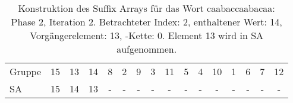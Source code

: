 \begin{table}[H]
\begin{adjustbox}{max width=\textwidth}
\begin{tabular}{lccccccccccccccc}
\multicolumn{1}{l|}{Gruppe}  & \multicolumn{1}{c|}{15} & 13                         & \multicolumn{1}{c|}{14}                         & \multicolumn{1}{c|}{8}     & \multicolumn{1}{c|}{2}      & \multicolumn{1}{c|}{9}    & \multicolumn{1}{c|}{3}     & \multicolumn{1}{c|}{11} & \multicolumn{1}{c|}{5}   & 4  & \multicolumn{1}{c|}{10} & 1   & 6   & 7   & 12  \\
\multicolumn{1}{l|}{SA}      & \multicolumn{1}{c|}{15} & \cellcolor[HTML]{\green}14 & \multicolumn{1}{c|}{\cellcolor[HTML]{\red}13} & \multicolumn{1}{c|}{-}     & \multicolumn{1}{c|}{-}      & \multicolumn{1}{c|}{-}    & \multicolumn{1}{c|}{-}     & \multicolumn{1}{c|}{-}  & \multicolumn{1}{c|}{-}   & -  & \multicolumn{1}{c|}{-}  & -   & -   & -   & -  
\end{tabular}
\end{adjustbox}

\caption[Konstruktion des Suffix Arrays f{\"u}r das Wort caabaccaabacaa: Phase 2, Iteration 2]{Konstruktion des Suffix Arrays f{\"u}r das Wort caabaccaabacaa: Phase 2, Iteration 2. Betrachteter Index: 2, enthaltener Wert: 14, Vorg{\"a}ngerelement: 13, \prevpointer-Kette: 0. Element 13 wird in SA aufgenommen.}
\label{table_complex_example_2_2} 
\end{table}

